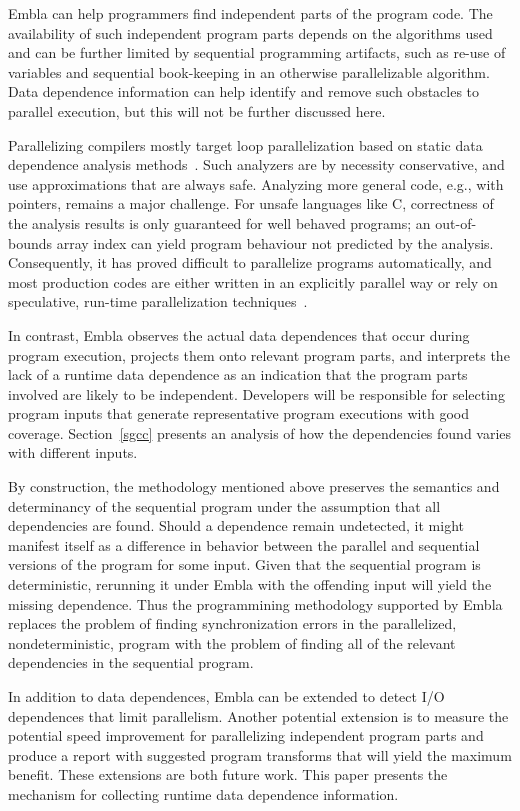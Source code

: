 \documentclass[times, 10pt,twocolumn]{article}
\begin{document}
Embla can help programmers find independent parts of the 
program code. 
The availability of such independent program parts depends on
the algorithms used and can be further
limited by sequential programming artifacts, such as re-use of
variables and sequential book-keeping in an otherwise parallelizable
algorithm.  Data dependence information can help
identify and remove such obstacles to parallel execution, but this
will not be further discussed here.

Parallelizing compilers mostly target loop parallelization based on
static data dependence analysis methods~\cite{KA02}.  Such analyzers
are by necessity conservative, and use approximations that are always
safe.  Analyzing more general code, e.g., with pointers, remains a
major challenge. For unsafe languages like C, correctness of the
analysis results is only guaranteed for well behaved programs; an
out-of-bounds array index can yield program behaviour not predicted by
the analysis. Consequently, it has proved difficult to parallelize
programs automatically, and most production codes are either written
in an explicitly parallel way or rely on speculative, run-time
parallelization techniques~\cite{PO03,CL03}.

In contrast, Embla
observes the actual data dependences that occur during program
execution, projects them onto relevant program parts, and interprets the
lack of a runtime data dependence as an indication that the program
parts involved are likely to be independent.
Developers will be responsible for selecting
program inputs that generate representative program executions with
good coverage. Section~\ref{sgcc} presents an analysis of how the
dependencies found varies with different inputs.

By construction, the methodology mentioned above preserves the
semantics and determinancy of the sequential program under the
assumption that all dependencies are found.  Should a dependence
remain undetected, it might manifest itself as a difference in
behavior between the parallel and sequential versions of the program
for some input. Given that the sequential program is deterministic,
rerunning it under Embla with the offending input will yield the
missing dependence.  Thus the programmining methodology supported by
Embla replaces the problem of finding synchronization errors in the
parallelized, nondeterministic, program with the problem of finding
all of the relevant dependencies in the sequential program.


In addition to data dependences, Embla can be extended to
detect I/O dependences that limit parallelism.  Another potential
extension is to measure the potential speed
improvement for parallelizing independent program parts and produce a
report with suggested program transforms that will yield the maximum
benefit.  These extensions are both future work.  This paper
presents the mechanism for collecting runtime data dependence information.
\end{document}
